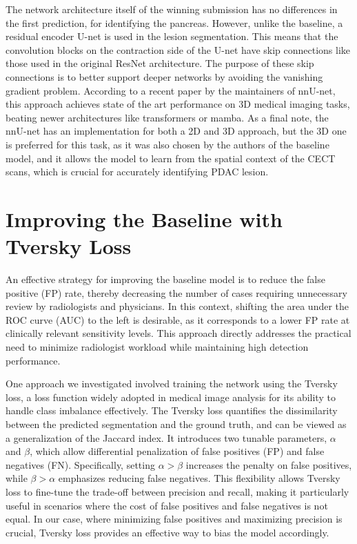 \documentclass[conference]{IEEEtran}
\begin{document}
The network architecture itself of the winning submission has no differences in the first prediction, for identifying the pancreas. However, unlike the baseline, a residual encoder U-net is used in the lesion segmentation. This means that the convolution blocks on the contraction side of the U-net have skip connections like those used in the original ResNet architecture\cite{b12}. The purpose of these skip connections is to better support deeper networks by avoiding the vanishing gradient problem. According to a recent paper by the maintainers of nnU-net, this approach achieves state of the art performance on 3D medical imaging tasks, beating newer architectures like transformers or mamba\cite{b11}. As a final note, the nnU-net has an implementation for both a 2D and 3D approach, but the 3D one is preferred for this task, as it was also chosen by the authors of the baseline model, and it allows the model to learn from the spatial context of the CECT scans, which is crucial for accurately identifying PDAC lesion.

\section{Improving the Baseline with Tversky Loss}

An effective strategy for improving the baseline model is to reduce the false positive (FP) rate, thereby decreasing the number of cases requiring unnecessary review by radiologists and physicians. In this context, shifting the area under the ROC curve (AUC) to the left is desirable, as it corresponds to a lower FP rate at clinically relevant sensitivity levels. This approach directly addresses the practical need to minimize radiologist workload while maintaining high detection performance.

One approach we investigated involved training the network using the Tversky loss, a loss function widely adopted in medical image analysis for its ability to handle class imbalance effectively. The Tversky loss quantifies the dissimilarity between the predicted segmentation and the ground truth, and can be viewed as a generalization of the Jaccard index\cite{b3}. It introduces two tunable parameters, $\alpha$ and $\beta$, which allow differential penalization of false positives (FP) and false negatives (FN). Specifically, setting $\alpha > \beta$ increases the penalty on false positives, while $\beta > \alpha$ emphasizes reducing false negatives. This flexibility allows Tversky loss to fine-tune the trade-off between precision and recall, making it particularly useful in scenarios where the cost of false positives and false negatives is not equal. In our case, where minimizing false positives and maximizing precision is crucial, Tversky loss provides an effective way to bias the model accordingly.
\end{document}
